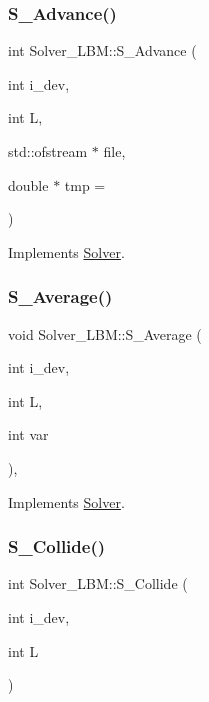 \subsubsection{\texorpdfstring{S\+\_\+\+Advance()}{S\_Advance()}}
{\footnotesize\ttfamily int Solver\+\_\+\+L\+B\+M\+::\+S\+\_\+\+Advance (\begin{DoxyParamCaption}\item[{int}]{i\+\_\+dev,  }\item[{int}]{L,  }\item[{std\+::ofstream $\ast$}]{file,  }\item[{double $\ast$}]{tmp = {} }\end{DoxyParamCaption})\hspace{0.3cm}{\ttfamily [virtual]}}



Implements \hyperlink{classSolver_a4bbad207af5ea842a472a35049d4fbb9}{Solver}.

\mbox{\label{classSolver__LBM_ae4487d21dd9b3f94a4e6e367b37698fa}} 
\subsubsection{\texorpdfstring{S\+\_\+\+Average()}{S\_Average()}}
{\footnotesize\ttfamily void Solver\+\_\+\+L\+B\+M\+::\+S\+\_\+\+Average (\begin{DoxyParamCaption}\item[{int}]{i\+\_\+dev,  }\item[{int}]{L,  }\item[{int}]{var }\end{DoxyParamCaption})\hspace{0.3cm}{\ttfamily [inline]}, {\ttfamily [virtual]}}



Implements \hyperlink{classSolver_a19b326267dbafa8b000b92a449c32b79}{Solver}.

\mbox{\label{classSolver__LBM_ab8c4daacb227f1ac1bf6a54097d65bd3}} 
\subsubsection{\texorpdfstring{S\+\_\+\+Collide()}{S\_Collide()}}
{\footnotesize\ttfamily int Solver\+\_\+\+L\+B\+M\+::\+S\+\_\+\+Collide (\begin{DoxyParamCaption}\item[{int}]{i\+\_\+dev,  }\item[{int}]{L }\end{DoxyParamCaption})}

